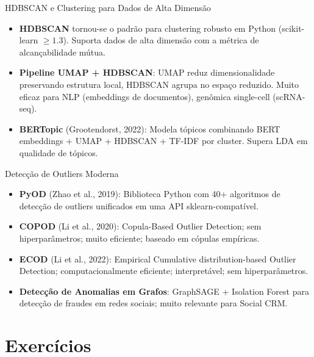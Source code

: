 \documentclass[12pt,a4paper]{article}
\begin{document}
\begin{estadoartebox}{HDBSCAN e Clustering para Dados de Alta Dimensão}
\begin{itemize}
  \item \textbf{HDBSCAN} tornou-se o padrão para clustering robusto em Python (scikit-learn $\geq 1.3$). Suporta dados de alta dimensão com a métrica de alcançabilidade mútua.
  \item \textbf{Pipeline UMAP + HDBSCAN}: UMAP reduz dimensionalidade preservando estrutura local, HDBSCAN agrupa no espaço reduzido. Muito eficaz para NLP (embeddings de documentos), genômica single-cell (scRNA-seq).
  \item \textbf{BERTopic} (Grootendorst, 2022): Modela tópicos combinando BERT embeddings + UMAP + HDBSCAN + TF-IDF por cluster. Supera LDA em qualidade de tópicos.
\end{itemize}
\end{estadoartebox}

\begin{estadoartebox}{Detecção de Outliers Moderna}
\begin{itemize}
  \item \textbf{PyOD} (Zhao et al., 2019): Biblioteca Python com 40+ algoritmos de detecção de outliers unificados em uma API sklearn-compatível.
  \item \textbf{COPOD} (Li et al., 2020): Copula-Based Outlier Detection; sem hiperparâmetros; muito eficiente; baseado em cópulas empíricas.
  \item \textbf{ECOD} (Li et al., 2022): Empirical Cumulative distribution-based Outlier Detection; computacionalmente eficiente; interpretável; sem hiperparâmetros.
  \item \textbf{Detecção de Anomalias em Grafos}: GraphSAGE + Isolation Forest para detecção de fraudes em redes sociais; muito relevante para Social CRM.
\end{itemize}
\end{estadoartebox}

\section{Exercícios}
\end{document}
